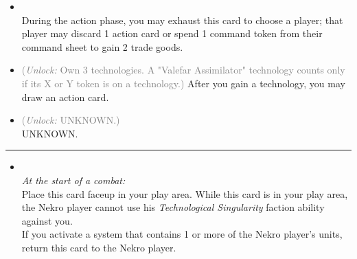\begin{multicols}{2}
\begin{itemize}
\item {}\\
During the action phase, you may exhaust this card to choose a player; that player may discard 1 action card or spend 1 command token from their command sheet to gain 2 trade goods.
\item {} \textcolor{gray}{(\emph{Unlock:} Own 3 technologies. A "Valefar Assimilator" technology counts only if its X or Y token is on a technology.)}
After you gain a technology, you may draw an action card.
\item {} \textcolor{gray}{(\emph{Unlock:} UNKNOWN.)}\\
UNKNOWN.
\end{itemize}

\vspace{-10pt}\rule{\hsize}{0.4pt}\vspace{5pt}


\begin{itemize}
\item {}\\
\emph{At the start of a combat:}\\
Place this card faceup in your play area. While this card is in your play area, the Nekro player cannot use his \emph{Technological Singularity} faction ability against you.\\
If you activate a system that contains 1 or more of the Nekro player's units, return this card to the Nekro player.
\end{itemize}

\end{multicols}




